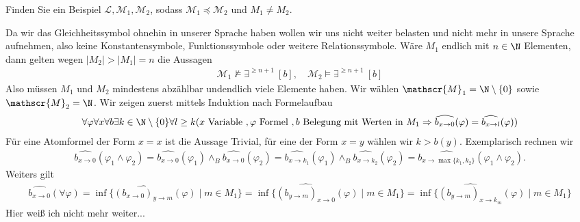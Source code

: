
\begin{exercise}[143]
Finden Sie ein Beispiel $\mathscr{L},\mathscr{M}_1,\mathscr{M}_2$, sodass
$\mathscr{M}_1 \preccurlyeq \mathscr{M}_2$ und $M_1 \neq M_2$.
\end{exercise}

\begin{solution}
	Da wir das Gleichheitssymbol ohnehin in unserer Sprache haben wollen wir uns nicht weiter belasten und nicht mehr in unsere Sprache aufnehmen, also keine Konstantensymbole, Funktionssymbole oder weitere Relationssymbole. Wäre $M_1$ endlich mit $n \in \N$ Elementen, dann gelten wegen $ |M_2| > |M_1| = n$ die Aussagen
	\begin{align*}
	\mathscr{M}_1 \nvDash \exists^{\geq n + 1} \ [b], \quad \mathscr{M}_2 \vDash \exists^{\geq n + 1} \ [b]
	\end{align*}
	 Also müssen $M_1$ und $M_2$ mindestens abzählbar undendlich viele Elemente haben. Wir wählen $\mathscr{M}_1 = \N \setminus \{0\}$ sowie $\mathscr{M}_2 = \N$. Wir zeigen zuerst mittels Induktion nach Formelaufbau
	 \begin{align*}
	 \forall \varphi \forall x \forall b \exists k \in \N \setminus  \{0\} \forall l \geq k (x \text{ Variable }, \varphi \text{ Formel }, b \text{ Belegung mit Werten in } M_1 \Rightarrow \widehat{b_{x \to 0}}(\varphi) = \widehat{b_{x \to l}}(\varphi))
	 \end{align*}
	 Für eine Atomformel der Form $x = x$ ist die Aussage Trivial, für eine der Form $x = y$ wählen wir $k > b(y)$. Exemplarisch rechnen wir
	 \begin{align*}
	 \widehat{b_{x \to 0}}(\varphi_1 \land \varphi_2) = \widehat{b_{x \to 0}}(\varphi_1) \land_B \widehat{b_{x \to 0}}(\varphi_2) = \widehat{b_{x \to k_1}}(\varphi_1) \land_B  \widehat{b_{x \to k_2}}(\varphi_2) = \widehat{b_{x \to \max\{k_1, k_2\}}}(\varphi_1 \land \varphi_2).
	 \end{align*}
	 Weiters gilt 
	 \begin{align*}
	 \widehat{b_{x \to 0}}(\forall \varphi) = \inf\{\widehat{(b_{x \to 0})_{y \to m}}(\varphi) \mid m \in M_1\} =  \inf\{\widehat{(b_{y \to m})_{x \to 0}}(\varphi) \mid m \in M_1\} = \inf\{\widehat{(b_{y \to m})_{x \to k_m}}(\varphi) \mid m \in M_1\}
	 \end{align*}
	 Hier weiß ich nicht mehr weiter...
\end{solution}
